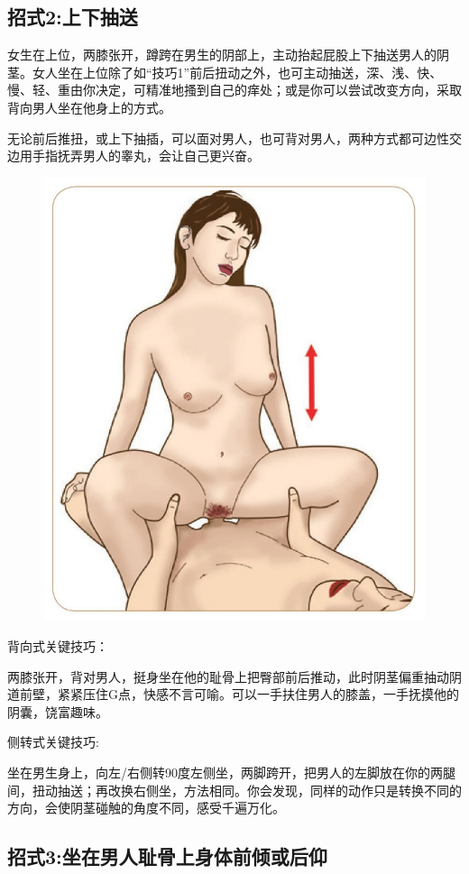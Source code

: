 \documentclass[12pt,UTF8]{ctexbook}
\begin{document}
\subsection{招式2:上下抽送}

女生在上位，两膝张开，蹲跨在男生的阴部上，主动抬起屁股上下抽送男人的阴茎。女人坐在上位除了如“技巧1”前后扭动之外，也可主动抽送，深、浅、快、慢、轻、重由你决定，可精准地搔到自己的痒处；或是你可以尝试改变方向，采取背向男人坐在他身上的方式。

无论前后推扭，或上下抽插，可以面对男人，也可背对男人，两种方式都可边性交边用手指抚弄男人的睾丸，会让自己更兴奋。

\begin{figure}[htbp]
	\centering
	\includegraphics[width=0.7\linewidth]{25}
	\caption{}
	\label{fig:1}
\end{figure}

背向式关键技巧：

两膝张开，背对男人，挺身坐在他的耻骨上把臀部前后推动，此时阴茎偏重抽动阴道前壁，紧紧压住G点，快感不言可喻。可以一手扶住男人的膝盖，一手抚摸他的阴囊，饶富趣味。

侧转式关键技巧:

坐在男生身上，向左/右侧转90度左侧坐，两脚跨开，把男人的左脚放在你的两腿间，扭动抽送；再改换右侧坐，方法相同。你会发现，同样的动作只是转换不同的方向，会使阴茎碰触的角度不同，感受千遍万化。

\subsection{招式3:坐在男人耻骨上身体前倾或后仰}
\end{document}
